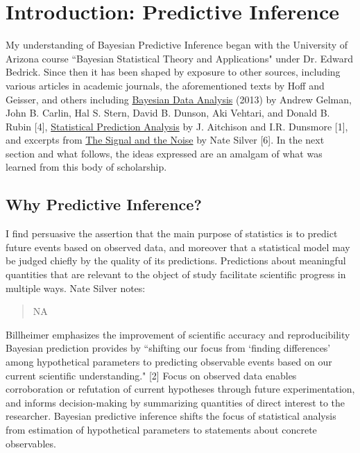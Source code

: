 \documentclass[12pt, a4paper]{article}
\begin{document}

\section{Introduction:  Predictive Inference}

My understanding of Bayesian Predictive Inference began with the University of Arizona course ``Bayesian Statistical Theory and Applications" under Dr. Edward Bedrick.  Since then it has been shaped by exposure to other sources, including various articles in academic journals, the aforementioned texts by Hoff and Geisser, and others including \underline{Bayesian Data Analysis} (2013) by Andrew Gelman, John B. Carlin, Hal S. Stern, David B. Dunson, Aki Vehtari, and Donald B. Rubin [4], \underline{Statistical Prediction Analysis} by J. Aitchison and I.R. Dunsmore [1], and excerpts from \underline{The Signal and the Noise} by Nate Silver [6].  In the next section and what follows, the ideas expressed are an amalgam of what was learned from this body of scholarship.

  \subsection{Why Predictive Inference?}


I find persuasive the assertion that the main purpose of statistics is to predict future events based on observed data, and moreover that a statistical model may be judged chiefly by the quality of its predictions.  Predictions about meaningful quantities that are relevant to the object of study facilitate scientific progress in multiple ways.  Nate Silver notes:

\begin{quote}
NA
\end{quote}

\noindent Billheimer emphasizes the improvement of scientific accuracy and reproducibility Bayesian prediction provides by ``shifting our focus from `finding differences' among hypothetical parameters to predicting observable events based on our current scientific understanding." [2] Focus on observed data enables corroboration or refutation of current hypotheses through future experimentation, and informs decision-making by summarizing quantities of direct interest to the researcher.  Bayesian predictive inference shifts the focus of statistical analysis from estimation of hypothetical parameters to statements about concrete observables.\\
\end{document}
